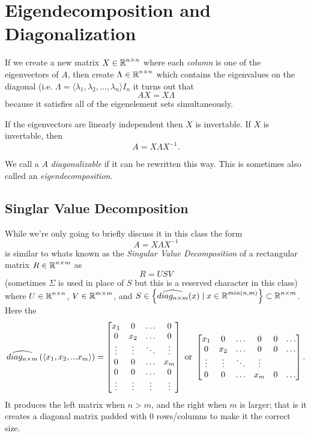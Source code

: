 \section{Eigendecomposition and Diagonalization}
If we create a new matrix $X\in\operatorname{\mathbb{R}}^{n\times n}$ where each \textit{column} is one of the eigenvectors of $A$, 
then create $\Lambda\in\operatorname{\mathbb{R}}^{n\times n}$ which contains the eigenvalues on the diagonal (i.e. $\Lambda = \langle\lambda_1,\lambda_2,...,\lambda_n\rangle I_n$ it turns out that 
\[ AX = X\Lambda \]
because it satisfies all of the eigenelement sets simultaneously. 

If the eigenvectors are linearly independent then $X$ is invertable. 
If $X$ is invertable, then 
\[ A = X\Lambda X^{-1}.\]

We call a $A$ \emph{diagonalizable} if it can be rewritten this way. 
This is sometimes also called an \emph{eigendecomposition}.

\subsection{Singlar Value Decomposition}
While we're only going to briefly discuss it in this class
the form \[ A = X\Lambda X^{-1}\]
is similar to whats known as the \emph{Singular Value Decomposition} 
of a rectangular matrix $R\in\operatorname{\mathbb{R}}^{n\times m}$
as 
\[R=USV\]
 (sometimes $\Sigma$ is used in place of $S$ but this is a reserved character in this class) 
 where $U\in\operatorname{\mathbb{R}}^{n\times n}$, $V\in\operatorname{\mathbb{R}}^{m\times m}$, 
 and $S\in\left\{\widehat{diag_{n\times m}}(x) \mid x\in\operatorname{\mathbb{R}}^{min(n,m)}\right\}\subset\operatorname{\mathbb{R}}^{n\times m}$.
 Here the \[\widehat{diag_{n\times m}}\left(\left\langle x_1,x_2,...x_m\right\rangle\right) = 
 \begin{bmatrix}x_1 & 0 & \hdots & 0\\0 & x_2 & \hdots & 0\\\vdots&\vdots&\ddots&\vdots\\0 & 0 & \hdots & x_m\\0 & 0 & \hdots &0\\\vdots&\vdots&\vdots&\vdots\\\end{bmatrix} \textnormal{ or }
 \begin{bmatrix}x_1 & 0 & \hdots & 0 & 0 & \hdots\\0 & x_2 & \hdots & 0 & 0 & \hdots\\\vdots&\vdots&\ddots&\vdots\\0 & 0 & \hdots & x_m & 0 & \hdots\\\end{bmatrix}
 .\] 
 It produces the left matrix when $n>m$, and the right when $m$ is larger; 
 that is it creates a diagonal matrix padded with 0 rows/columns to make it the correct size.
 
